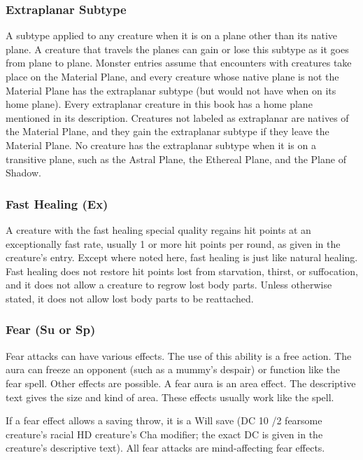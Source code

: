 {\subsubsection{Extraplanar Subtype} A subtype applied to any creature when it is on a plane other than its native plane. A creature that travels the planes can gain or lose this subtype as it goes from plane to plane. Monster entries assume that encounters with creatures take place on the Material Plane, and every creature whose native plane is not the Material Plane has the extraplanar subtype (but would not have when on its home plane). Every extraplanar creature in this book has a home plane mentioned in its description. Creatures not labeled as extraplanar are natives of the Material Plane, and they gain the extraplanar subtype if they leave the Material Plane. No creature has the extraplanar subtype when it is on a transitive plane, such as the Astral Plane, the Ethereal Plane, and the Plane of Shadow.

\subsubsection{Fast Healing (Ex)} A creature with the fast healing special quality regains hit points at an exceptionally fast rate, usually 1 or more hit points per round, as given in the creature's entry. Except where noted here, fast healing is just like natural healing. Fast healing does not restore hit points lost from starvation, thirst, or suffocation, and it does not allow a creature to regrow lost body parts. Unless otherwise stated, it does not allow lost body parts to be reattached.

\subsubsection{Fear (Su or Sp)} Fear attacks can have various effects.
 The use of this ability is a free action. The aura can freeze an opponent (such as a mummy's despair) or function like the fear spell. Other effects are possible. A fear aura is an area effect. The descriptive text gives the size and kind of area.
 These effects usually work like the  spell. 
\par If a fear effect allows a saving throw, it is a Will save (DC 10 /2 fearsome creature's racial HD \add creature's Cha modifier; the exact DC is given in the creature's descriptive text). All fear attacks are mind-affecting fear effects.

}
